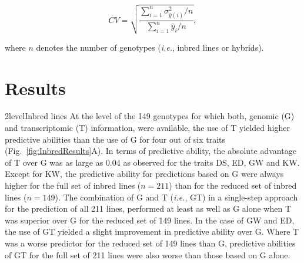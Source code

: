 \documentclass[12pt,titlepage]{article}
\begin{document}
\begin{equation} \label{eq:CV}
CV = \sqrt{\frac{\sum_{i = 1}^{n} \sigma^{2}_{\hat{y}(i)} / n}{\sum_{i=1}^{n}\hat{y}_{i} / n}},
\end{equation}

where $n$ denotes the number of genotypes (\textit{i.e.}, inbred lines or 
hybrids).












\section*{Results}
\Genetics2level{Inbred lines}
At the level of the 149 genotypes for which both, genomic (G) and 
transcriptomic (T) information, were available, the use of T yielded higher
predictive abilities than the use of G for four out of six traits
(Fig.~\ref{fig:InbredResults}A).
In terms of predictive ability, the absolute advantage of T over G was as large 
as 0.04 as observed for the traits DS, ED, GW and KW\@.
Except for KW, the predictive ability for predictions based on G were always
higher for the full set of inbred lines ($n = 211$) than for the reduced set of 
inbred lines ($n = 149$).
The combination of G and T (\textit{i.e.}, GT) in a single-step approach for the 
prediction of all 211 lines, performed at least as well as G alone when T was 
superior over G for the reduced set of 149 lines.
In the case of GW and ED, the use of GT yielded a slight improvement in predictive 
ability over G.
Where T was a worse predictor for the reduced set of 149 lines than G,
predictive abilities of GT for the full set of 211 lines were also worse than 
those based on G alone.
\end{document}
